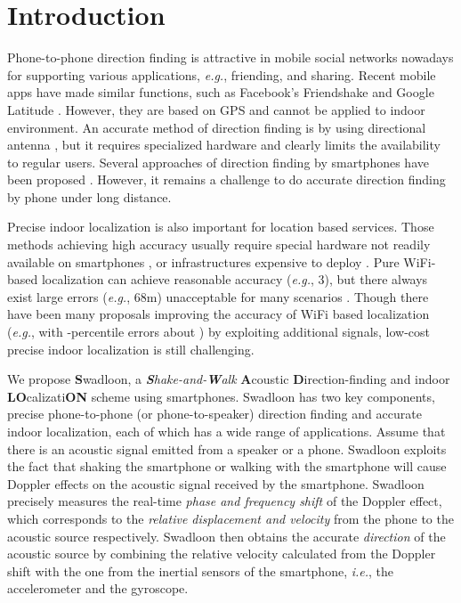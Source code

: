 \documentclass[]{sig-alternate-10pt}
\def\ie{\textit{i.e.}\xspace}
\def\eg{\textit{e.g.}\xspace}
\def \ourprotocol{Swadloon\xspace}
\begin{document}
\section{Introduction}
\label{sec:intro}

Phone-to-phone direction finding is attractive in mobile social
 networks nowadays for supporting various applications, \eg,
 friending, and sharing.
Recent mobile apps have made similar functions, such as
 Facebook's Friendshake \cite{friendshake} and Google Latitude
 \cite{GoogleLatitude}. However, they are based on GPS and cannot be applied
 to indoor environment.  An accurate method of direction finding is by
 using directional antenna
\cite{4711074,4509717,Niculescu:2004:VBS:1023720.1023727},
but it requires specialized hardware and clearly limits the
availability to regular users. Several approaches of direction
finding by smartphones have been proposed
\cite{2011-MOBICOM-Iamantenna,2012-MobiQuitous2011-ProposalDirectionEstimation,2011-SenSys-feasibilityrealtime}. However,
it  remains a challenge to do accurate direction finding by phone
 under long distance.

Precise indoor localization is also important for location based
 services.
Those methods achieving high accuracy usually require special hardware
 not readily available on smartphones
\cite{6071927}, or infrastructures
 expensive to deploy
 \cite{DBLP:journals/tsmc/LiuDBL07}.
Pure WiFi-based localization can achieve reasonable accuracy (\eg,
 3), but there always exist large errors (\eg, 68m)
 unacceptable for many scenarios  \cite{2012-MOBICOM-PushlimitWiFi}.
Though there have  been many proposals  improving the accuracy of WiFi
 based localization (\eg, with -percentile errors about 
 \cite{2012-MOBICOM-PushlimitWiFi}) by exploiting additional signals,
 low-cost precise indoor localization is still  challenging.


We propose \textbf \ourprotocol, a
\emph{\textbf{S}hake-and-\textbf{W}alk} \textbf{A}coustic
 \textbf{D}irection-finding and indoor \textbf{LO}calizati\textbf{ON}
 scheme using smartphones.
\ourprotocol has two key components, precise phone-to-phone
 (or phone-to-speaker) direction finding and
 accurate indoor localization, each of which has a wide range of
 applications.
Assume that there is an acoustic signal emitted from a speaker or a
 phone.
\ourprotocol exploits the fact that  shaking the smartphone or walking with
 the smartphone  will cause Doppler effects on the
  acoustic signal received by the smartphone.
\ourprotocol  precisely measures
 the real-time \textit{phase and frequency shift} of the Doppler effect, which
 corresponds to the \textit{relative displacement and velocity} from the phone to the
 acoustic source respectively.
\ourprotocol then obtains the accurate \textit{direction} of the
 acoustic source by combining the relative velocity calculated from the
 Doppler shift with the one from the  inertial sensors of the
 smartphone, \ie, the accelerometer and the gyroscope.
\end{document}
